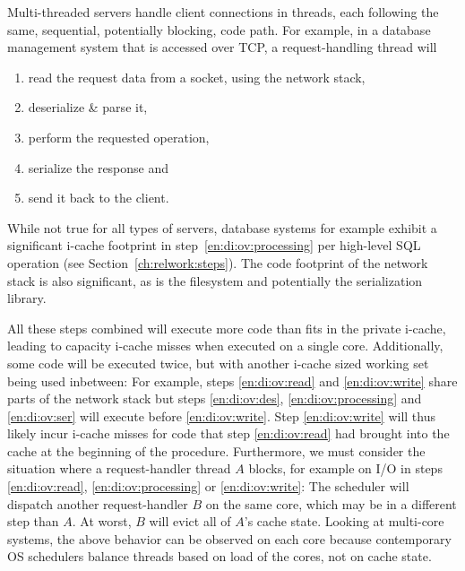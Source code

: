 \documentclass[12pt,a4paper]{book}
\begin{document}
Multi-threaded servers handle client connections in threads, each following the same, sequential, potentially blocking, code path.
For example, in a database management system that is accessed over TCP, a request-handling thread will
\begin{enumerate}[label=(\alph*)]
    \item read the request data from a socket, using the network stack, \label{en:di:ov:read}
    \item deserialize \& parse it, \label{en:di:ov:des}
    \item perform the requested operation,\label{en:di:ov:processing}
    \item serialize the response and \label{en:di:ov:ser}
    \item send it back to  the client. \label{en:di:ov:write}
\end{enumerate}
While not true for all types of servers, database systems for example exhibit a significant i-cache footprint in step~\ref{en:di:ov:processing} per high-level SQL operation (see Section~\ref{ch:relwork:steps}).
The code footprint of the network stack is also significant, as is the filesystem and potentially the serialization library.

All these steps combined will execute more code than fits in the private i-cache, leading to capacity i-cache misses when executed on a single core.
Additionally, some code will be executed twice, but with another i-cache sized working set being used inbetween:
For example, steps \ref{en:di:ov:read} and \ref{en:di:ov:write} share parts of the network stack but steps \ref{en:di:ov:des}, \ref{en:di:ov:processing} and \ref{en:di:ov:ser} will execute before \ref{en:di:ov:write}.
Step \ref{en:di:ov:write} will thus likely incur i-cache misses for code that step \ref{en:di:ov:read} had brought into the cache at the beginning of the procedure.
Furthermore, we must consider the situation where a request-handler thread $A$ blocks, for example on I/O in steps \ref{en:di:ov:read}, \ref{en:di:ov:processing} or \ref{en:di:ov:write}:
The scheduler will dispatch another request-handler $B$ on the same core, which may be in a different step than $A$.
At worst, $B$ will evict all of $A$'s cache state.
Looking at multi-core systems, the above behavior can be observed on each core because contemporary OS schedulers balance threads based on load of the cores, not on cache state.~\cite{freeBSDSchedulerLoad}
\end{document}
